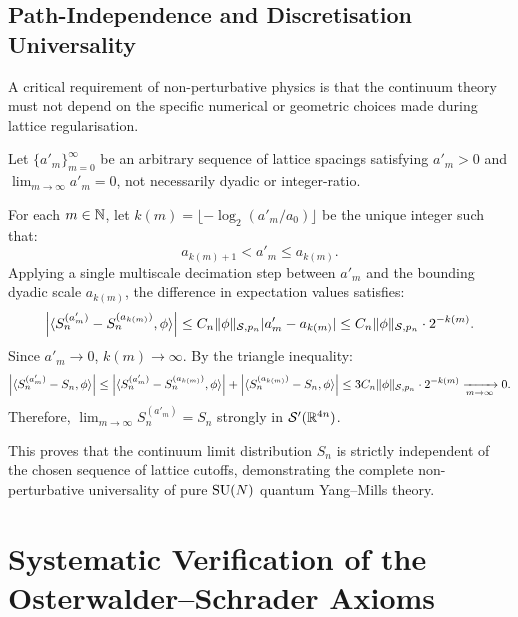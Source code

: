 \subsection{Path-Independence and Discretisation Universality}
\label{subsec:path_independence}

A critical requirement of non-perturbative physics is that the continuum theory must not depend on the specific numerical or geometric choices made during lattice regularisation.

\begin{remark}
\label{rem:path_independence}
Let $\{a'_m\}_{m=0}^\infty$ be an arbitrary sequence of lattice spacings satisfying $a'_m > 0$ and $\lim_{m \to \infty} a'_m = 0$, not necessarily dyadic or integer-ratio.

For each $m \in \mathbb{N}$, let $k(m) = \lfloor -\log_2(a'_m / a_0) \rfloor$ be the unique integer such that:
\begin{equation}
a_{k(m)+1} < a'_m \le a_{k(m)}.
\end{equation}
Applying a single multiscale decimation step between $a'_m$ and the bounding dyadic scale $a_{k(m)}$, the difference in expectation values satisfies:
\begin{equation}
\left| \langle S_n^{(a'_m)} - S_n^{(a_{k(m)})}, \phi \rangle \right| \le C_n \|\phi\|_{\mathcal{S}, p_n} |a'_m - a_{k(m)}| \le C_n \|\phi\|_{\mathcal{S}, p_n} \cdot 2^{-k(m)}.
\end{equation}
Since $a'_m \to 0$, $k(m) \to \infty$. By the triangle inequality:
\begin{equation}
\left| \langle S_n^{(a'_m)} - S_n, \phi \rangle \right| \le \left| \langle S_n^{(a'_m)} - S_n^{(a_{k(m)})}, \phi \rangle \right| + \left| \langle S_n^{(a_{k(m)})} - S_n, \phi \rangle \right| \le 3 C_n \|\phi\|_{\mathcal{S}, p_n} \cdot 2^{-k(m)} \xrightarrow[m \to \infty]{} 0.
\end{equation}
Therefore, $\lim_{m \to \infty} S_n^{(a'_m)} = S_n$ strongly in $\mathcal{S}'(\mathbb{R}^{4n})$.

This proves that the continuum limit distribution $S_n$ is strictly independent of the chosen sequence of lattice cutoffs, demonstrating the complete non-perturbative universality of pure $\mathrm{SU}(N)$ quantum Yang--Mills theory.
\end{remark}

\section{Systematic Verification of the Osterwalder--Schrader Axioms}
\label{sec:os_axioms_verification}

